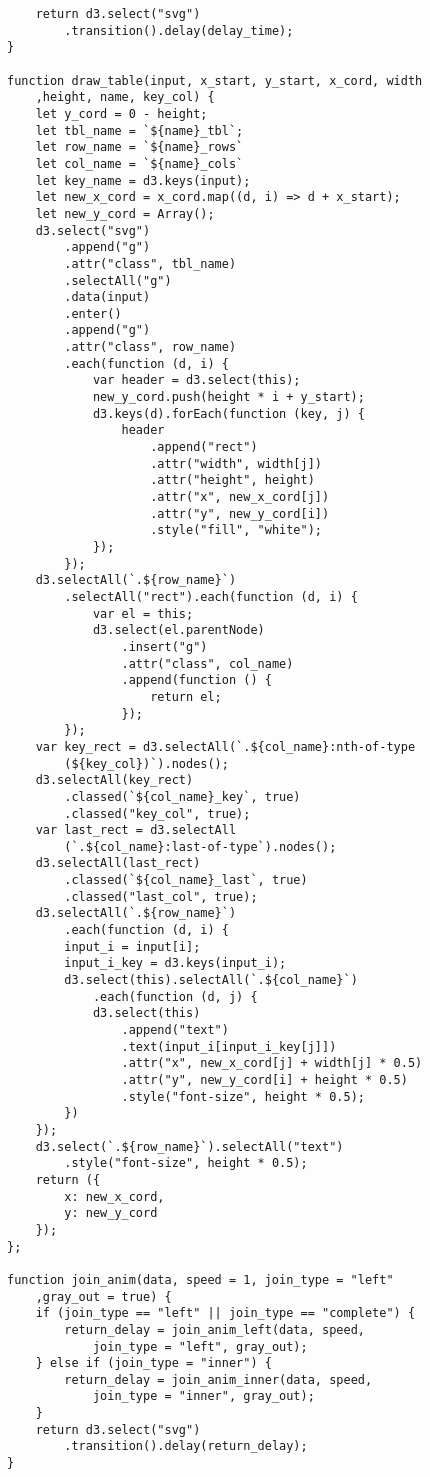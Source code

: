 \begin{lstlisting}
    return d3.select("svg")
        .transition().delay(delay_time);
}

function draw_table(input, x_start, y_start, x_cord, width
    ,height, name, key_col) {
    let y_cord = 0 - height;
    let tbl_name = `${name}_tbl`;
    let row_name = `${name}_rows`
    let col_name = `${name}_cols`
    let key_name = d3.keys(input);
    let new_x_cord = x_cord.map((d, i) => d + x_start);
    let new_y_cord = Array();
    d3.select("svg")
        .append("g")
        .attr("class", tbl_name)
        .selectAll("g")
        .data(input)
        .enter()
        .append("g")
        .attr("class", row_name)
        .each(function (d, i) {
            var header = d3.select(this);
            new_y_cord.push(height * i + y_start);
            d3.keys(d).forEach(function (key, j) {
                header
                    .append("rect")
                    .attr("width", width[j])
                    .attr("height", height)
                    .attr("x", new_x_cord[j])
                    .attr("y", new_y_cord[i])
                    .style("fill", "white");
            });
        });
    d3.selectAll(`.${row_name}`)
        .selectAll("rect").each(function (d, i) {
            var el = this;
            d3.select(el.parentNode)
                .insert("g")
                .attr("class", col_name)
                .append(function () {
                    return el;
                });
        });
    var key_rect = d3.selectAll(`.${col_name}:nth-of-type
        (${key_col})`).nodes();
    d3.selectAll(key_rect)
        .classed(`${col_name}_key`, true)
        .classed("key_col", true);
    var last_rect = d3.selectAll
        (`.${col_name}:last-of-type`).nodes();
    d3.selectAll(last_rect)
        .classed(`${col_name}_last`, true)
        .classed("last_col", true);
    d3.selectAll(`.${row_name}`)
        .each(function (d, i) {
        input_i = input[i];
        input_i_key = d3.keys(input_i);
        d3.select(this).selectAll(`.${col_name}`)
            .each(function (d, j) {
            d3.select(this)
                .append("text")
                .text(input_i[input_i_key[j]])
                .attr("x", new_x_cord[j] + width[j] * 0.5)
                .attr("y", new_y_cord[i] + height * 0.5)
                .style("font-size", height * 0.5);
        })
    });
    d3.select(`.${row_name}`).selectAll("text")
        .style("font-size", height * 0.5);
    return ({
        x: new_x_cord,
        y: new_y_cord
    });
};

function join_anim(data, speed = 1, join_type = "left"
    ,gray_out = true) {
    if (join_type == "left" || join_type == "complete") {
        return_delay = join_anim_left(data, speed, 
            join_type = "left", gray_out);
    } else if (join_type = "inner") {
        return_delay = join_anim_inner(data, speed, 
            join_type = "inner", gray_out);
    }
    return d3.select("svg")
        .transition().delay(return_delay);
}


\end{lstlisting}
